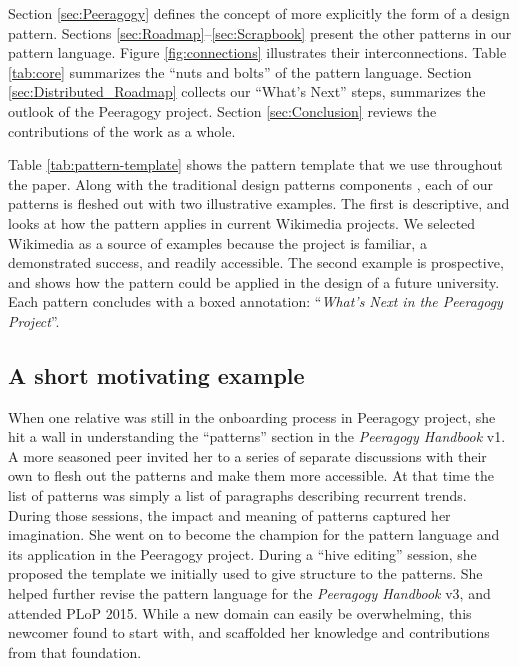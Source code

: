 Section \ref{sec:Peeragogy} defines the concept of  more explicitly the form of a design pattern.  Sections \ref{sec:Roadmap}--\ref{sec:Scrapbook} present the other patterns in our pattern language. Figure \ref{fig:connections} illustrates their interconnections. Table \ref{tab:core} summarizes the ``nuts and bolts'' of the pattern language.
Section \ref{sec:Distributed_Roadmap} collects our ``What's Next'' steps, summarizes the outlook of the Peeragogy project. Section \ref{sec:Conclusion} reviews the contributions of the work as a whole.%

Table \ref{tab:pattern-template} shows the pattern template that we use throughout the paper.  
Along with the traditional design patterns components \cite{meszaros1998pattern}, each of our patterns is fleshed out with two illustrative examples.  The first is descriptive, and looks at how the pattern applies in current Wikimedia projects.  We selected Wikimedia as a source of examples because the project is familiar, a demonstrated success, and readily accessible.  The second example is prospective, and shows how the pattern could be applied in the design of a future university.  Each pattern concludes with a boxed annotation: ``\emph{What's Next in the Peeragogy Project}''.

\subsection*{A short motivating example}
When one relative  was still in the onboarding process in Peeragogy project, she hit a wall in understanding the ``patterns'' section in the \emph{Peeragogy Handbook} v1.  A more seasoned peer invited her to a series of separate discussions with their own  to flesh out the patterns and make them more accessible.  At that time the list of patterns was simply a list of paragraphs describing recurrent trends.  During those sessions, the impact and meaning of patterns captured her imagination.  She went on to become the champion for the pattern language and its application in the Peeragogy project.  During a ``hive editing'' session, she proposed the template we initially used to give structure to the patterns.  She helped further revise the pattern language for the \emph{Peeragogy Handbook}  v3, and attended PLoP 2015.  While a new domain can easily be overwhelming, this newcomer found  to start with, and scaffolded her knowledge and contributions from that foundation.

